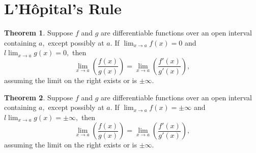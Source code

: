 \documentclass[12pt, a4paper]{article}
\newcommand{\f}[2]{\frac{#1}{#2}}
\theoremstyle{definition}
\newtheorem{theorem}{Theorem}[section]
\theoremstyle{plain}
\begin{document}
\section{L'Hôpital's Rule}

\begin{theorem}
Suppose $f$ and $g$ are differentiable functions over an open interval containing $a,$ except possibly at $a.$ If $\lim_{x\to a} f(x)=0$ and $l\lim_{x\to a} g(x)=0,$ then $$\lim_{x\to a}\left(\f{f(x)}{g(x)}\right)=\lim_{x\to a} \left(\f{f'(x)}{g'(x)}\right),$$ assuming the limit on the right exists or is $\pm \infty.$
\end{theorem}

\begin{theorem}
Suppose $f$ and $g$ are differentiable functions over an open interval containing $a,$ except possibly at $a.$ If $\lim_{x\to a} f(x)=\pm \infty$ and $l\lim_{x\to a} g(x)=\pm \infty,$ then $$\lim_{x\to a}\left(\f{f(x)}{g(x)}\right)=\lim_{x\to a} \left(\f{f'(x)}{g'(x)}\right),$$ assuming the limit on the right exists or is $\pm \infty.$
\end{theorem}
\end{document}
